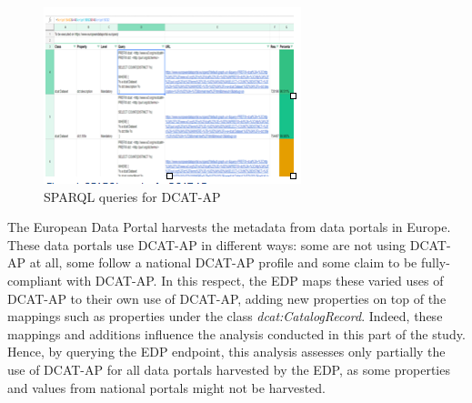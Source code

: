 \documentclass[<options>]{elsarticle}
\begin{document}
\begin{figure}[H]
\includegraphics[]{replace1.png}
\caption{SPARQL queries for DCAT-AP}
\label{SPARQLQueries}
\end{figure}

The European Data Portal harvests the metadata from data portals in Europe. These data portals use DCAT-AP in different ways: some are not using DCAT-AP at all, some follow a national DCAT-AP profile and some claim to be fully-compliant with DCAT-AP. In this respect, the EDP maps these varied uses of DCAT-AP to their own use of DCAT-AP, adding new properties on top of the mappings such as properties under the class \textit{dcat:CatalogRecord}. Indeed, these mappings and additions influence the analysis conducted in this part of the study. Hence, by querying the EDP endpoint, this analysis assesses only partially the use of DCAT-AP for all data portals harvested by the EDP, as some properties and values from national portals might not be harvested.
\end{document}
